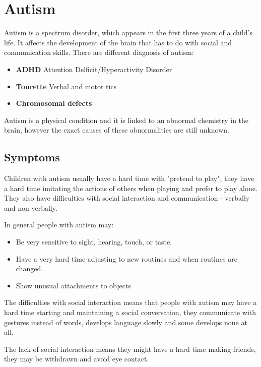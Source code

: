 \section{Autism}

Autism is a spectrum disorder, which appears in the first three years of a child's life. It affects the development of the brain that has to do with social and communication skills. There are different diagnosis of autism:

\begin{itemize}
\item \textbf{ADHD} Attention Delficit/Hyperactivity Disorder
\item \textbf{Tourette} Verbal and motor tics
\item \textbf{Chromosomal defects}
\end{itemize}

Autism is a physical condition and it is linked to an abnormal chemistry in the brain, however the exact causes of these abnormalities are still unknown.\citep{} 

\subsection*{Symptoms} 

Children with autism usually have a hard time with "pretend to play", they have a hard time imitating the actions of others when playing and prefer to play alone. They also have difficulties with social interaction and communication - verbally and non-verbally. 

In general people with autism may:

\begin{itemize}
\item Be very sensitive to sight, hearing, touch, or taste.
\item Have a very hard time adjusting to new routines and when routines are changed.
\item Show unusual attachments to objects
\end{itemize} 

The difficulties with social interaction means that people with autism may have a hard time starting and maintaining a social conversation, they communicate with gestures instead of words, develops language slowly and some develops none at all. 

The lack of social interaction means they might have a hard time making friends, they may be withdrawn and avoid eye contact.\citep{autism}

